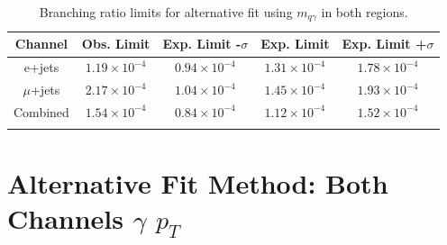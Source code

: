 \begin{table}[h!]
\begin{center}
{\renewcommand{\arraystretch}{1.2}
\begin{tabular}{ccccc}
\hhline{=====}
Channel  	&  Obs. Limit			&	Exp. Limit -$\sigma$	& Exp. Limit	& Exp. Limit +$\sigma$  \\  \hline 
e+jets	& $1.19\times10^{-4}$ 	& $0.94\times10^{-4}$	& $1.31\times10^{-4}$ & $1.78\times10^{-4}$	\\
$\mu$+jets	& $2.17\times10^{-4}$ 	& $1.04\times10^{-4}$	& $1.45\times10^{-4}$ & $1.93\times10^{-4}$	\\
Combined	& $1.54\times10^{-4}$ 	& $0.84\times10^{-4}$	& $1.12\times10^{-4}$ & $1.52\times10^{-4}$	\\
\hhline{=====}
\end{tabular}
\caption{Branching ratio limits for alternative fit using $m_{q\gamma}$ in both regions.}
}
\end{center}
\end{table}


\section{Alternative Fit Method: Both Channels $\gamma$ $p_T$}
\label{sec:addfitel}

